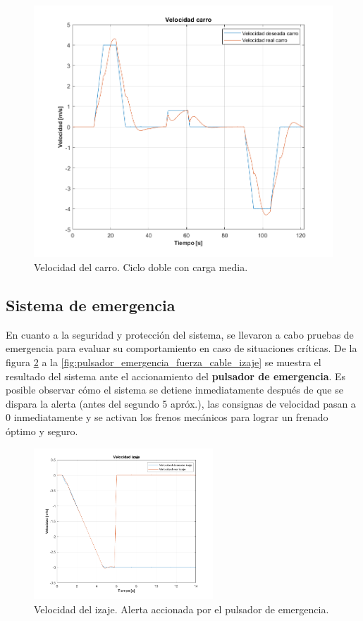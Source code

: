 \documentclass[11pt]{article}
\begin{document}
\begin{figure}%
	\centering
	\includegraphics[width=1\textwidth]{images/ciclo_doble_carga_media/velocidad_carro.png}
	\caption{Velocidad del carro. Ciclo doble con carga media.}
	\label{fig:ciclo_doble_media_carga_velocidad_carro}
\end{figure}

\newpage

\subsection{Sistema de emergencia}

En cuanto a la seguridad y protección del sistema, se llevaron a cabo pruebas de emergencia para evaluar su comportamiento en caso de situaciones críticas. De la figura \ref{fig:pulsador_emergencia_velocidad_izaje} a la \ref{fig:pulsador_emergencia_fuerza_cable_izaje} se muestra el resultado del sistema ante el accionamiento del \textbf{pulsador de emergencia}. Es posible observar cómo el sistema se detiene inmediatamente después de que se dispara la alerta (antes del segundo 5 apróx.), las consignas de velocidad pasan a 0 inmediatamente y se activan los frenos mecánicos para lograr un frenado óptimo y seguro.

\begin{figure}[!h]
	\centering
	\includegraphics[width=0.6\textwidth]{images/Freno_emergencia/velocidad_izaje.png}
	\caption{Velocidad del izaje. Alerta accionada por el pulsador de emergencia.}
	\label{fig:pulsador_emergencia_velocidad_izaje}
\end{figure}
\end{document}
